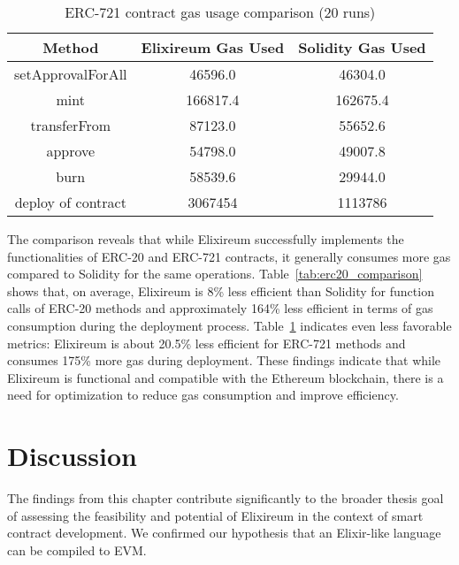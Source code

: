 \begin{table}[h!]
\centering
\renewcommand{\arraystretch}{1.2}
\begin{tabular}{|c|c|c|}
\hline
\textbf{Method}         & \textbf{Elixireum Gas Used} & \textbf{Solidity Gas Used} \\ \hline
setApprovalForAll       & 46596.0              & 46304.0              \\ \hline
mint                    & 166817.4             & 162675.4             \\ \hline
transferFrom            & 87123.0              & 55652.6              \\ \hline
approve                 & 54798.0              & 49007.8              \\ \hline
burn                    & 58539.6              & 29944.0              \\ \hline
deploy of contract                 & 3067454              & 1113786              \\ \hline
\end{tabular}
\caption{ERC-721 contract gas usage comparison (20 runs)}
\label{tab:erc721_comparison}
\end{table}

  The comparison reveals that while Elixireum successfully implements the functionalities of ERC-20 and ERC-721 contracts, it generally consumes more gas compared to Solidity for the same operations. Table~\ref{tab:erc20_comparison} shows that, on average, Elixireum is 8\% less efficient than Solidity for function calls of ERC-20 methods and approximately 164\% less efficient in terms of gas consumption during the deployment process. Table~\ref{tab:erc721_comparison} indicates even less favorable metrics: Elixireum is about 20.5\% less efficient for ERC-721 methods and consumes 175\% more gas during deployment. These findings indicate that while Elixireum is functional and compatible with the Ethereum blockchain, there is a need for optimization to reduce gas consumption and improve efficiency.

\section{Discussion}
\label{sec:discussion}

The findings from this chapter contribute significantly to the broader thesis goal of assessing the feasibility and potential of Elixireum in the context of smart contract development. We confirmed our hypothesis that an Elixir-like language can be compiled to EVM.

